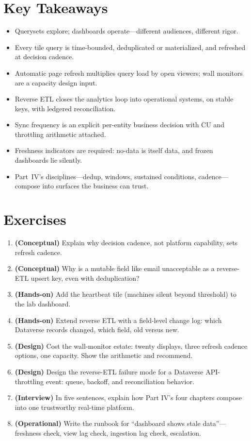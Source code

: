 \section*{Key Takeaways}
\begin{itemize}
    \item Querysets explore; dashboards operate---different audiences, different rigor.
    \item Every tile query is time-bounded, deduplicated or materialized, and refreshed at decision cadence.
    \item Automatic page refresh multiplies query load by open viewers; wall monitors are a capacity design input.
    \item Reverse ETL closes the analytics loop into operational systems, on stable keys, with ledgered reconciliation.
    \item Sync frequency is an explicit per-entity business decision with CU and throttling arithmetic attached.
    \item Freshness indicators are required: no-data is itself data, and frozen dashboards lie silently.
    \item Part~IV's disciplines---dedup, windows, sustained conditions, cadence---compose into surfaces the business can trust.
\end{itemize}

\section{Exercises}
\begin{enumerate}
    \item \textbf{(Conceptual)} Explain why decision cadence, not platform capability, sets refresh cadence.
    \item \textbf{(Conceptual)} Why is a mutable field like email unacceptable as a reverse-ETL upsert key, even with deduplication?
    \item \textbf{(Hands-on)} Add the heartbeat tile (machines silent beyond threshold) to the lab dashboard.
    \item \textbf{(Hands-on)} Extend reverse ETL with a field-level change log: which Dataverse records changed, which field, old versus new.
    \item \textbf{(Design)} Cost the wall-monitor estate: twenty displays, three refresh cadence options, one capacity. Show the arithmetic and recommend.
    \item \textbf{(Design)} Design the reverse-ETL failure mode for a Dataverse API-throttling event: queue, backoff, and reconciliation behavior.
    \item \textbf{(Interview)} In five sentences, explain how Part IV's four chapters compose into one trustworthy real-time platform.
    \item \textbf{(Operational)} Write the runbook for ``dashboard shows stale data''---freshness check, view lag check, ingestion lag check, escalation.
\end{enumerate}

